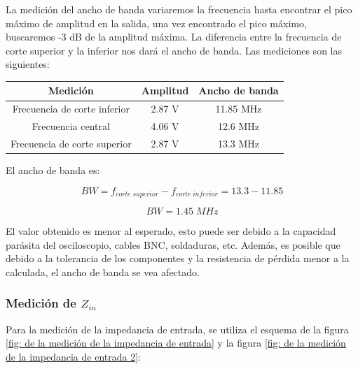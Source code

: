 La medición del ancho de banda variaremos la frecuencia hasta encontrar el pico máximo de amplitud en la salida, una vez encontrado
el pico máximo, buscaremos -3 dB de la amplitud máxima. La diferencia entre la frecuencia de corte superior y la inferior nos dará el ancho de banda. 
Las mediciones son las siguientes:

\begin{table}[h]
    \centering
    \begin{tabular}{|c|c|c|}
    \hline
    \rowcolor[HTML]{C0C0C0} 
    \textbf{Medición} & \textbf{Amplitud} & \textbf{Ancho de banda} \\ \hline
    Frecuencia de corte inferior            & 2.87 V             & 11.85 MHz                \\ \hline
    Frecuencia central         & 4.06 V             & 12.6 MHz                \\ \hline
    Frecuencia de corte superior            & 2.87 V             & 13.3 MHz                \\ \hline
    \end{tabular}
\end{table}

El ancho de banda es:

\begin{equation}
    BW = f_{corte\; superior} - f_{corte\; inferior} = 13.3 - 11.85
\end{equation}

\begin{equation}
    \boxed{BW = 1.45\; MHz}
\end{equation}

El valor obtenido es menor al esperado, esto puede ser debido a la capacidad parásita del osciloscopio, cables BNC, soldaduras, etc. Además, es posible
que debido a la tolerancia de los componentes y la resistencia de pérdida menor a la calculada, el ancho de banda se vea afectado.

\subsubsection{Medición de $Z_{in}$}

Para la medición de la impedancia de entrada, se utiliza el esquema de la figura \ref{fig: de la medición de la impedancia de entrada}
y la figura \ref{fig: de la medición de la impedancia de entrada 2}:

